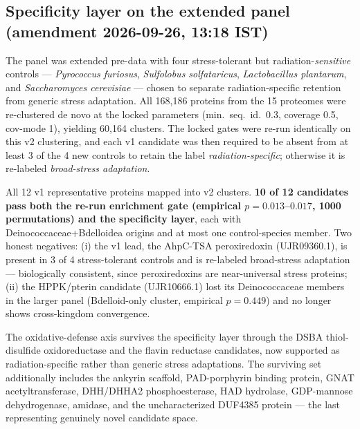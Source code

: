 \documentclass[12pt,a4paper]{article}
\begin{document}
\subsection{Specificity layer on the extended panel (amendment 2026-09-26, 13:18 IST)}
The panel was extended pre-data with four stress-tolerant but radiation-\emph{sensitive} controls --- \emph{Pyrococcus furiosus}, \emph{Sulfolobus solfataricus}, \emph{Lactobacillus plantarum}, and \emph{Saccharomyces cerevisiae} --- chosen to separate radiation-specific retention from generic stress adaptation. All 168,186 proteins from the 15 proteomes were re-clustered de novo at the locked parameters (min.\ seq.\ id.\ 0.3, coverage 0.5, cov-mode 1), yielding 60,164 clusters. The locked gates were re-run identically on this v2 clustering, and each v1 candidate was then required to be absent from at least 3 of the 4 new controls to retain the label \emph{radiation-specific}; otherwise it is re-labeled \emph{broad-stress adaptation}.

All 12 v1 representative proteins mapped into v2 clusters. \textbf{10 of 12 candidates pass both the re-run enrichment gate (empirical $p=0.013$--$0.017$, 1000 permutations) and the specificity layer}, each with Deinococcaceae+Bdelloidea origins and at most one control-species member. Two honest negatives: (i) the v1 lead, the AhpC-TSA peroxiredoxin (UJR09360.1), is present in 3 of 4 stress-tolerant controls and is re-labeled broad-stress adaptation --- biologically consistent, since peroxiredoxins are near-universal stress proteins; (ii) the HPPK/pterin candidate (UJR10666.1) lost its Deinococcaceae members in the larger panel (Bdelloid-only cluster, empirical $p=0.449$) and no longer shows cross-kingdom convergence.

The oxidative-defense axis survives the specificity layer through the DSBA thiol-disulfide oxidoreductase and the flavin reductase candidates, now supported as radiation-specific rather than generic stress adaptations. The surviving set additionally includes the ankyrin scaffold, PAD-porphyrin binding protein, GNAT acetyltransferase, DHH/DHHA2 phosphoesterase, HAD hydrolase, GDP-mannose dehydrogenase, amidase, and the uncharacterized DUF4385 protein --- the last representing genuinely novel candidate space.
\end{document}
